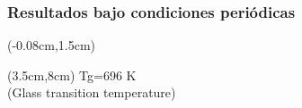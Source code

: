 \documentclass[12pt,t]{beamer}
\begin{document}
\begin{frame}
    \frametitle{Resultados bajo condiciones peri\'odicas}
    \begin{textblock*}{12.6cm}(-0.08cm,1.5cm) 
      \begin{figure}[htp]
	\centering
      \end{figure}
    \end{textblock*}
    \begin{textblock*}{6cm}(3.5cm,8cm) 
    \centering
      Tg=696 K\\
      (Glass transition temperature)
    \end{textblock*}
\end{frame}
\end{document}
